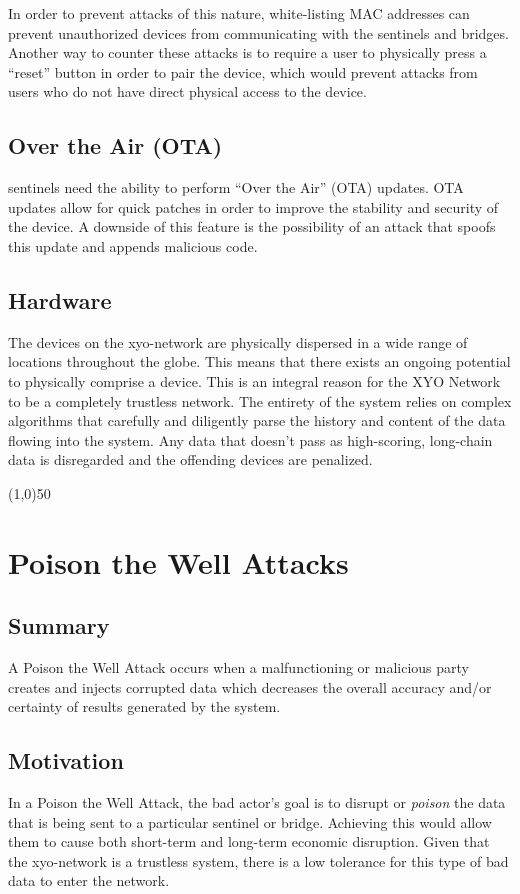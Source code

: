 \documentclass{article}
\begin{document}
In order to prevent attacks of this nature, white-listing MAC addresses can prevent unauthorized devices from communicating with the \Glspl{sentinel} and \Glspl{bridge}. Another way to counter these attacks is to require a user to physically press a ``reset'' button in order to pair the device, which would prevent attacks from users who do not have direct physical access to the device. 

\subsection{Over the Air (OTA)}
\Glspl{sentinel} need the ability to perform ``Over the Air'' (OTA) updates. OTA updates allow for quick patches in order to improve the stability and security of the device. A downside of this feature is the possibility of an attack that spoofs this update and appends malicious code. 


\subsection{Hardware}
The devices on the \Gls{xyo-network} are physically dispersed in a wide range of locations throughout the globe. This means that there exists an ongoing potential to physically comprise a device. This is an integral reason for the XYO Network to be a completely \gls{trustless} network. The entirety of the system relies on complex algorithms that carefully and diligently parse the history and content of the data flowing into the system. Any data that doesn't pass as high-scoring, long-chain data is disregarded and the offending devices are penalized. 

\begin{center}
\line(1,0){50}
\end{center}

\section{Poison the Well Attacks}
\subsection{Summary}
A Poison the Well Attack occurs when a malfunctioning or malicious party creates and injects corrupted data which decreases the overall \gls{accuracy} and/or \gls{certainty} of results generated by the system.

\subsection{Motivation}
In a Poison the Well Attack, the bad actor's goal is to disrupt or \textit{poison} the data that is being sent to a particular \Gls{sentinel} or \Gls{bridge}. Achieving this would allow them to cause both short-term and long-term economic disruption. Given that the \Gls{xyo-network} is a \gls{trustless} system, there is a low tolerance for this type of bad data to enter the network. 
\end{document}
